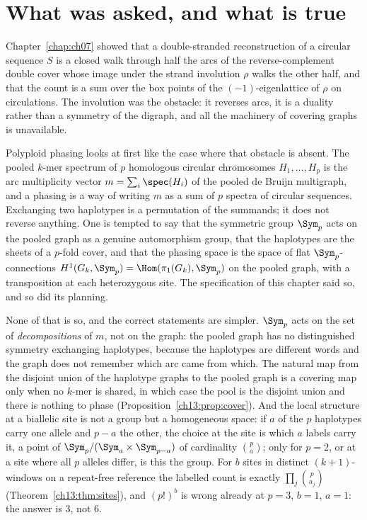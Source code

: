 \section{What was asked, and what is true}

Chapter~\ref{chap:ch07} showed that a double-stranded reconstruction of a circular
sequence $S$ is a closed walk through half the arcs of the reverse-complement double cover
whose image under the strand involution $\rho$ walks the other half, and that the count is a
sum over the box points of the $(-1)$-eigenlattice of $\rho$ on circulations. The involution
was the obstacle: it reverses arcs, it is a duality rather than a symmetry of the digraph, and
all the machinery of covering graphs is unavailable.

Polyploid phasing looks at first like the case where that obstacle is absent. The pooled
$k$-mer spectrum of $p$ homologous circular chromosomes $H_1,\dots,H_p$ is the arc
multiplicity vector $m=\sum_i\spec(H_i)$ of the pooled de Bruijn multigraph, and a phasing is
a way of writing $m$ as a sum of $p$ spectra of circular sequences. Exchanging two haplotypes
is a permutation of the summands; it does not reverse anything. One is tempted to say that the
symmetric group $\Sym_p$ acts on the pooled graph as a genuine automorphism group, that the
haplotypes are the sheets of a $p$-fold cover, and that the phasing space is the space of flat
$\Sym_p$-connections $H^1(G_k,\Sym_p)=\Hom(\pi_1(G_k),\Sym_p)$ on the pooled graph, with a
transposition at each heterozygous site. The specification of this chapter said so, and so did
its planning.

None of that is so, and the correct statements are simpler. $\Sym_p$ acts on the set of
\emph{decompositions} of $m$, not on the graph: the pooled graph has no distinguished symmetry
exchanging haplotypes, because the haplotypes are different words and the graph does not
remember which arc came from which. The natural map from the disjoint union of the haplotype
graphs to the pooled graph is a covering map only when no $k$-mer is shared, in which case
the pool is the disjoint union and there is nothing to phase (Proposition~\ref{ch13:prop:cover}).
And the local structure at a biallelic site is not a group but a homogeneous space: if $a$ of
the $p$ haplotypes carry one allele and $p-a$ the other, the choice at the site is which $a$
labels carry it, a point of $\Sym_p/(\Sym_a\times\Sym_{p-a})$ of cardinality $\binom pa$; only
for $p=2$, or at a site where all $p$ alleles differ, is this the group. For $b$ sites in
distinct $(k{+}1)$-windows on a repeat-free reference the labelled count is exactly
$\prod_j\binom{p}{a_j}$ (Theorem~\ref{ch13:thm:sites}), and $(p!)^b$ is wrong already at $p=3$,
$b=1$, $a=1$: the answer is $3$, not $6$.

